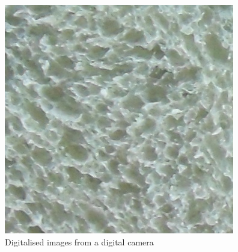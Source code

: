 \documentclass[oneside,a4paper,english,links,12pt]{article}
\begin{document}
\begin{figure}[htb]
\includegraphics[scale=0.20]{imagenes/Sa14}
\caption{Digitalised images from a digital camera}
\label{fig:camera}
\end{figure}
\end{document}
